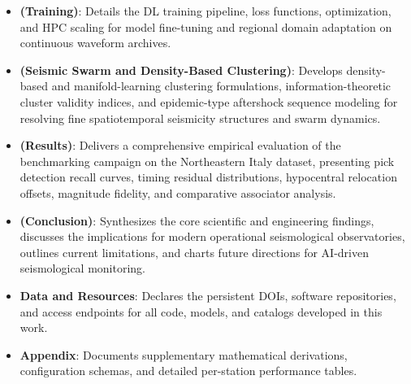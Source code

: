 \begin{itemize}
    profiles.
  \item \textbf{ (Training)}: Details the \ac{DL} training
    pipeline, loss functions, optimization, and \ac{HPC} scaling for model
    fine-tuning and regional domain adaptation on continuous waveform archives.
  \item \textbf{ (Seismic Swarm and Density-Based
    Clustering)}: Develops density-based and manifold-learning clustering
    formulations, information-theoretic cluster validity indices, and
    epidemic-type aftershock sequence modeling for resolving fine
    spatiotemporal seismicity structures and swarm dynamics.
  \item \textbf{ (Results)}: Delivers a comprehensive
    empirical evaluation of the benchmarking campaign on the Northeastern Italy
    dataset, presenting pick detection recall curves, timing residual
    distributions, hypocentral relocation offsets, magnitude fidelity, and
    comparative associator analysis.
  \item \textbf{ (Conclusion)}: Synthesizes the core
    scientific and engineering findings, discusses the implications for modern
    operational seismological observatories, outlines current limitations, and
    charts future directions for \ac{AI}-driven seismological monitoring.
  \item \textbf{Data and Resources}: Declares the persistent \acp{DOI},
    software repositories, and access endpoints for all code, models, and
    catalogs developed in this work.
  \item \textbf{Appendix}: Documents supplementary mathematical derivations,
    configuration schemas, and detailed per-station performance tables.
\end{itemize}

